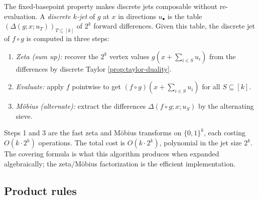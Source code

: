 \documentclass[10pt,a4paper]{article}
\theoremstyle{plain}
\theoremstyle{definition}
\newcommand{\1}{\mathbb{1}} %
\newcommand{\set}[1]{\{#1\}} %
\newcommand{\tightlist}{\setlength{\itemsep}{0pt}\setlength{\parskip}{0pt}}
\begin{document}
The fixed-basepoint property makes discrete jets composable without
re-evaluation. A \emph{discrete \(k\)-jet} of \(g\) at \(x\) in
directions \(u_\bullet\) is the table
\((\Delta(g; x; u_T))_{T \subseteq [k]}\) of \(2^k\) forward
differences. Given this table, the discrete jet of \(f \circ g\) is
computed in three steps:

\begin{enumerate}
\def\labelenumi{\arabic{enumi}.}
\tightlist
\item
  \emph{Zeta (sum up):} recover the \(2^k\) vertex values
  \(g(x + \sum_{i \in S} u_i)\) from the differences by discrete Taylor
  \ref{prop:taylor-duality}.
\item
  \emph{Evaluate:} apply \(f\) pointwise to get
  \((f \circ g)(x + \sum_{i \in S} u_i)\) for all \(S \subseteq [k]\).
\item
  \emph{Möbius (alternate):} extract the differences
  \(\Delta(f \circ g; x; u_S)\) by the alternating sieve.
\end{enumerate}

Steps 1 and 3 are the fast zeta and Möbius transforms on
\(\set{0,1}^k\), each costing \(O(k \cdot 2^k)\) operations. The total
cost is \(O(k \cdot 2^k)\), polynomial in the jet size \(2^k\). The
covering formula is what this algorithm produces when expanded
algebraically; the zeta/Möbius factorization is the efficient
implementation.

\subsection{Product rules}\label{product-rules}
\end{document}
